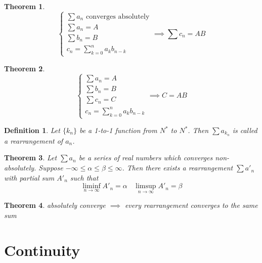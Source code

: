 \documentclass[aps,pra,onecolumn,notitlepage,superscriptaddress]{revtex4-1}
\newtheorem{theo}{Theorem}
\newtheorem{defi}{Definition}
\begin{document}
    \begin{theo}
        \begin{equation}
            \begin{cases}
                \sum a_n \text{ converges absolutely} \\
                \sum a_n = A \\
                \sum b_n = B \\
                c_n = \sum_{k=0}^n a_k b_{n-k}
            \end{cases}
            \implies \sum c_n = AB
        \end{equation}
    \end{theo}

    \begin{theo}
        \begin{equation}
            \begin{cases}
                \sum a_n = A \\
                \sum b_n = B \\
                \sum c_n = C \\
                c_n = \sum_{k=0}^n a_k b_{n-k}
            \end{cases}
            \implies C = AB
        \end{equation}
    \end{theo}

    \begin{defi}
        Let $\{k_n\}$ be a 1-to-1 function from $N^*$ to $N^*$. Then $\sum a_{k_n}$ is called a rearrangement of $a_n$.
    \end{defi}

    \begin{theo}
        Let $\sum a_n$ be a series of real numbers which converges non-absolutely. Suppose $-\infty \leq \alpha \leq \beta \leq \infty$. Then there exists a rearrangement $\sum a'_n$ with partial sum $A'_n$ such that
        \begin{equation}
            \liminf_{n \to \infty} A'_n = \alpha \ \ \ \ \limsup_{n \to \infty} A'_n = \beta
        \end{equation}
    \end{theo}

    \begin{theo}
        absolutely converge $\implies$ every rearrangement converges to the same sum
    \end{theo}

    \section{Continuity}
    
\end{document}
